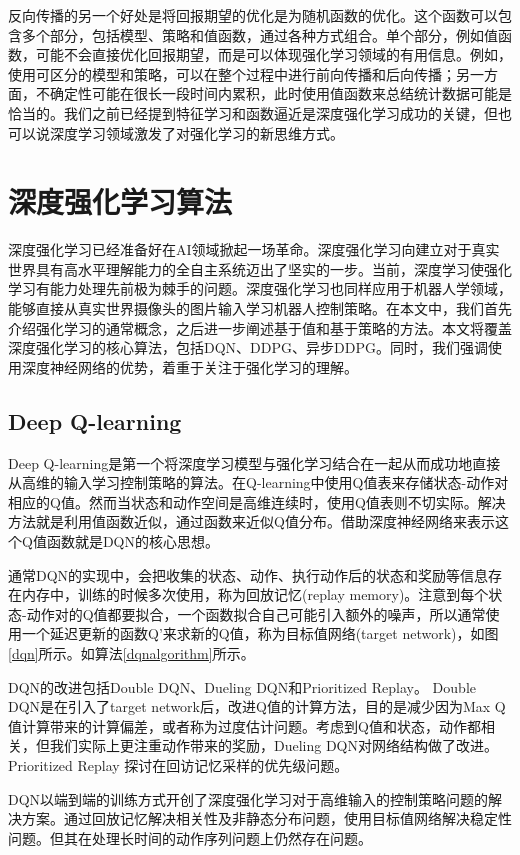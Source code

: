 反向传播的另一个好处是将回报期望的优化是为随机函数的优化。这个函数可以包含多个部分，包括模型、策略和值函数，通过各种方式组合。单个部分，例如值函数，可能不会直接优化回报期望，而是可以体现强化学习领域的有用信息。例如，使用可区分的模型和策略，可以在整个过程中进行前向传播和后向传播；另一方面，不确定性可能在很长一段时间内累积，此时使用值函数来总结统计数据可能是恰当的。我们之前已经提到特征学习和函数逼近是深度强化学习成功的关键，但也可以说深度学习领域激发了对强化学习的新思维方式。

\section{深度强化学习算法}
深度强化学习已经准备好在AI领域掀起一场革命。深度强化学习向建立对于真实世界具有高水平理解能力的全自主系统迈出了坚实的一步。当前，深度学习使强化学习有能力处理先前极为棘手的问题。深度强化学习也同样应用于机器人学领域，能够直接从真实世界摄像头的图片输入学习机器人控制策略。在本文中，我们首先介绍强化学习的通常概念，之后进一步阐述基于值和基于策略的方法。本文将覆盖深度强化学习的核心算法，包括DQN\cite{11}、DDPG\cite{26}、异步DDPG\cite{27}。同时，我们强调使用深度神经网络的优势，着重于关注于强化学习的理解。

\subsection{Deep Q-learning}
Deep Q-learning是第一个将深度学习模型与强化学习结合在一起从而成功地直接从高维的输入学习控制策略的算法。在Q-learning中使用Q值表来存储状态-动作对相应的Q值。然而当状态和动作空间是高维连续时，使用Q值表则不切实际。解决方法就是利用值函数近似，通过函数来近似Q值分布。借助深度神经网络来表示这个Q值函数就是DQN的核心思想。

通常DQN的实现中，会把收集的状态、动作、执行动作后的状态和奖励等信息存在内存中，训练的时候多次使用，称为回放记忆(replay memory)。注意到每个状态-动作对的Q值都要拟合，一个函数拟合自己可能引入额外的噪声，所以通常使用一个延迟更新的函数Q'来求新的Q值，称为目标值网络(target network)，如图\ref{dqn}所示。如算法\ref{dqnalgorithm}所示。

DQN的改进包括Double DQN\cite{28}、Dueling DQN\cite{29}和Prioritized Replay\cite{30}。
Double DQN是在引入了target network后，改进Q值的计算方法，目的是减少因为Max Q值计算带来的计算偏差，或者称为过度估计问题。考虑到Q值和状态，动作都相关，但我们实际上更注重动作带来的奖励，Dueling DQN对网络结构做了改进。Prioritized Replay 探讨在回访记忆采样的优先级问题。

DQN以端到端的训练方式开创了深度强化学习对于高维输入的控制策略问题的解决方案。通过回放记忆解决相关性及非静态分布问题，使用目标值网络解决稳定性问题。但其在处理长时间的动作序列问题上仍然存在问题。

